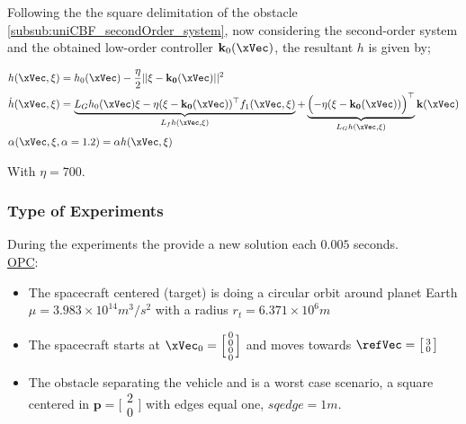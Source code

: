 Following the the square delimitation of the obstacle \ref{subsub:uniCBF_secondOrder_system}, now considering the second-order system and the obtained low-order controller \(\mathbf{k}_0(\xVec)\), the resultant  \(h\) is given by;

\begin{subequations}
   \begin{align}
    &h(\xVec, \xi) = h_0(\xVec) -  \frac{\eta}{2} || \xi - \mathbf{k_0(\xVec)}||^2 \label{eq:h_orbital} \\
    &\dot{h}(\xVec, \xi) = \underbrace{L_Gh_0(\xVec)\xi - \eta (\xi - \mathbf{k_0(\xVec)})^{\top}f_1(\xVec, \xi)}_{L_fh(\xVec, \xi)} + \underbrace{ \Bigl(  - \eta(\xi - \mathbf{k_0(\xVec)})\Bigr)^{\top}}_{L_Gh(\xVec, \xi)}  \mathbf{k}(\xVec)  \label{eq:dot_h_orbital} \\
    &\alpha(\xVec, \xi, \alpha = 1.2)  = \alpha h(\xVec, \xi) \label{eq:CBF_alpha_orbital}
\end{align}
\label{eq:CBF_orbital}
\end{subequations}

With \(\eta = 700\).

\newpage %

\subsubsection{Type of Experiments}
\label{subsubsec:orbital_type_of_experiments}


During the experiments the  provide a new solution each \(0.005\) seconds.\\


\underline{OPC}:
\label{ssssec:OPC} %
\begin{itemize}
  \item The  spacecraft centered (target) is doing a circular orbit around planet Earth \(\mu = 3.983 \times 10^{14} m^3/s^{2}\) with a radius \(r_t = 6.371 \times 10^6 m\)
  \item The spacecraft starts at \(\xVec_0 = \Bigl[\begin{smallmatrix} 0 \\ 0 \\ 0 \\ 0  \end{smallmatrix}\Bigr]\) and moves towards \(\refVec = \bigl[\begin{smallmatrix} 3 \\ 0 \end{smallmatrix}\bigr]\)
  \item The obstacle separating the vehicle and \txtref is a worst case scenario, a square centered in \(\mathbf{p} = \bigl[\begin{smallmatrix} 2 \\ 0 \end{smallmatrix}\bigr] \) with edges equal one, \(sqedge = 1 m\).
\end{itemize}



